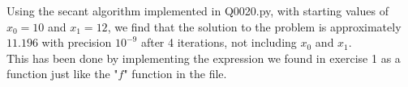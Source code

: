 Using the secant algorithm implemented in Q0020.py, with starting values of $x_0 = 10$ and $x_1 = 12$, we find that the solution to the problem is approximately $11.196$ with precision $10^{-9}$ after 4 iterations, not including $x_0$ and $x_1$.\\
This has been done by implementing the expression we found in exercise 1 as a function just like the "$f$" function in the file.
